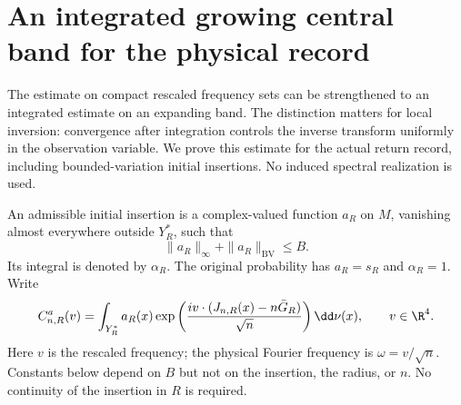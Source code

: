 \section{An integrated growing central band for the physical record}
\label{sec:growing-major-arc}
The estimate on compact rescaled frequency sets can be strengthened to
an integrated estimate on an expanding band. The distinction matters
for local inversion: convergence after integration controls the inverse
transform uniformly in the observation variable. We prove this estimate
for the actual return record, including bounded-variation initial
insertions. No induced spectral realization is used.

An admissible initial insertion is a complex-valued function $a_R$ on
$M$, vanishing almost everywhere outside $Y_R^*$, such that
\[
 \|a_R\|_\infty+\|a_R\|_{\mathrm{BV}}\le B.
\]
Its integral is denoted by $\alpha_R$. The original probability has
$a_R=s_R$ and $\alpha_R=1$. Write
\begin{equation}\label{eq:inserted-central-characteristic}
 C^a_{n,R}(v)=\int_{Y_R^*}a_R(x)
 \exp\left(\frac{i v\cdot(J_{n,R}(x)-n\bar G_R)}{\sqrt n}\right)
 \dd\nu(x),\qquad v\in\R^4.
\end{equation}
Here $v$ is the rescaled frequency; the physical Fourier frequency is
$\omega=v/\sqrt n$. Constants below depend on $B$ but not on the
insertion, the radius, or $n$. No continuity of the insertion in $R$
is required.

